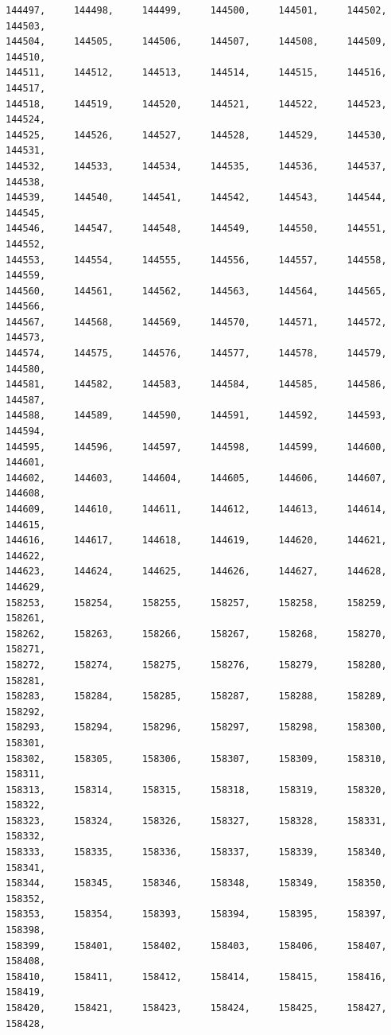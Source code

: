 \documentclass[a4paper,11pt]{report}
\begin{document}
\begin{verbatim}
144497,     144498,     144499,     144500,     144501,     144502,     144503,
144504,     144505,     144506,     144507,     144508,     144509,     144510,
144511,     144512,     144513,     144514,     144515,     144516,     144517,
144518,     144519,     144520,     144521,     144522,     144523,     144524,
144525,     144526,     144527,     144528,     144529,     144530,     144531,
144532,     144533,     144534,     144535,     144536,     144537,     144538,
144539,     144540,     144541,     144542,     144543,     144544,     144545,
144546,     144547,     144548,     144549,     144550,     144551,     144552,
144553,     144554,     144555,     144556,     144557,     144558,     144559,
144560,     144561,     144562,     144563,     144564,     144565,     144566,
144567,     144568,     144569,     144570,     144571,     144572,     144573,
144574,     144575,     144576,     144577,     144578,     144579,     144580,
144581,     144582,     144583,     144584,     144585,     144586,     144587,
144588,     144589,     144590,     144591,     144592,     144593,     144594,
144595,     144596,     144597,     144598,     144599,     144600,     144601,
144602,     144603,     144604,     144605,     144606,     144607,     144608,
144609,     144610,     144611,     144612,     144613,     144614,     144615,
144616,     144617,     144618,     144619,     144620,     144621,     144622,
144623,     144624,     144625,     144626,     144627,     144628,     144629,
158253,     158254,     158255,     158257,     158258,     158259,     158261,
158262,     158263,     158266,     158267,     158268,     158270,     158271,
158272,     158274,     158275,     158276,     158279,     158280,     158281,
158283,     158284,     158285,     158287,     158288,     158289,     158292,
158293,     158294,     158296,     158297,     158298,     158300,     158301,
158302,     158305,     158306,     158307,     158309,     158310,     158311,
158313,     158314,     158315,     158318,     158319,     158320,     158322,
158323,     158324,     158326,     158327,     158328,     158331,     158332,
158333,     158335,     158336,     158337,     158339,     158340,     158341,
158344,     158345,     158346,     158348,     158349,     158350,     158352,
158353,     158354,     158393,     158394,     158395,     158397,     158398,
158399,     158401,     158402,     158403,     158406,     158407,     158408,
158410,     158411,     158412,     158414,     158415,     158416,     158419,
158420,     158421,     158423,     158424,     158425,     158427,     158428,

\end{verbatim}
\end{document}

